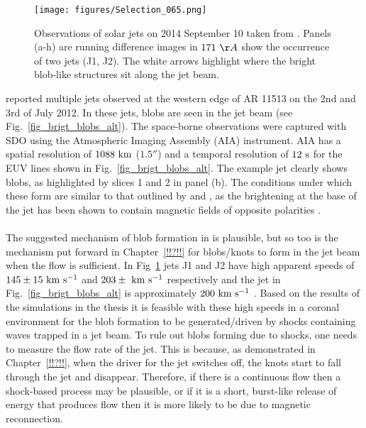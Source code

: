 \documentclass[12pt]{ociamthesis}
\newcommand{\kms}{~\rm{km ~s^{-1}}}
\newcommand{\np}{\\ \\}
\begin{document}
\begin{figure*}[h]
\begin{centering}
\texttt{[image: figures/Selection\_065.png]}
\caption{Observations of solar jets on  2014 September 10 taken from \cite{Zhang2016SoPh291859Z}. Panels (a-h) are running difference images in $171~\AA$ show the occurrence of two jets (J1, J2). The white arrows highlight where the bright blob-like structures sit along the jet beam.}
\label{fig_brigt_blobs_2} 
\end{centering}
\end{figure*}
%
\cite{Chen2015ApJ81571C, Chen2017ApJ84054C} reported multiple jets observed at the western edge of AR 11513 on the 2nd and 3rd of July 2012. In these jets, blobs are seen in the jet beam (see Fig.~\ref{fig_brigt_blobs_alt}). The space-borne observations were captured with SDO using the Atmospheric Imaging Assembly (AIA) instrument. AIA has a spatial resolution of $1088~\rm{km}$ ($\ang{;;1.5}$) and a temporal resolution of $12~\rm{s}$ for the EUV lines shown in Fig.~\ref{fig_brigt_blobs_alt}. The example jet clearly shows blobs, as highlighted by slices 1 and 2 in panel (b). The conditions under which these form are similar to that outlined by \cite{Zhang2014AA567A11Z} and \cite{Zhang2016SoPh291859Z}, as the brightening at the base of the jet has been shown to contain magnetic fields of opposite polarities \citep{Chen2017ApJ84054C}. \np
%
The suggested mechanism of blob formation in \cite{Zhang2016SoPh291859Z} is plausible, but so too is the mechanism put forward in Chapter~\ref{!!?!!} for blobs/knots to form in the jet beam when the flow is sufficient. In Fig~\ref{fig_brigt_blobs_2} jets J1 and J2 have high apparent speeds of $145\pm15\kms$ and $203\pm\kms$ respectively \citep{Zhang2016SoPh291859Z} and the jet in Fig.~\ref{fig_brigt_blobs_alt} is approximately $200\kms$ \citep{Chen2017ApJ84054C}. Based on the results of the simulations in the thesis it is feasible with these high speeds in a coronal environment for the blob formation to be generated/driven by shocks containing waves trapped in a jet beam. To rule out blobs forming due to shocks, one needs to measure the flow rate of the jet. This is because, as demonstrated in Chapter~\ref{!!?!!}, when the driver for the jet switches off, the knots start to fall through the jet and disappear. Therefore, if there is a continuous flow then a shock-based process may be plausible, or if it is a short, burst-like release of energy that produces flow then it is more likely to be due to magnetic reconnection.
\end{document}
